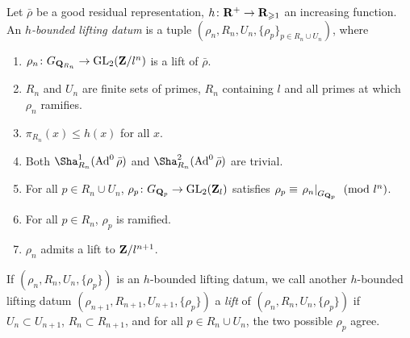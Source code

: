 \begin{definition}
Let $\bar\rho$ be a good residual representation, 
$h\colon \mathbf{R}^+ \to \mathbf{R}_{\geqslant 1}$ an 
increasing function. An \emph{$h$-bounded lifting datum} is a tuple 
$(\rho_n,R_n,U_n,\{\rho_p\}_{p\in R_n\cup U_n})$, where 
\begin{enumerate}
\item
$\rho_n\colon G_{\mathbf{Q}_{R_n}} \to \operatorname{GL}_2(\mathbf{Z}/l^n)$ is a lift of $\bar\rho$.

\item
$R_n$ and $U_n$ are finite sets of primes, $R_n$ containing $l$ and all primes at 
which $\rho_n$ ramifies. 

\item
$\pi_{R_n}(x)\leqslant h(x)$ for all $x$. 

\item
Both $\Sha_{R_n}^1(\Ad^0\bar\rho)$ and $\Sha_{R_n}^2(\Ad^0\bar\rho)$ are 
trivial. 

\item
For all $p\in R_n\cup U_n$, 
$\rho_p\colon G_{\mathbf{Q}_p} \to \operatorname{GL}_2(\mathbf{Z}_l)$ satisfies 
$\rho_p\equiv \left. \rho_n\right|_{G_{\mathbf{Q}_p}}\pmod{l^n}$. 

\item
For all $p\in R_n$, $\rho_p$ is ramified. 

\item
$\rho_n$ admits a lift to $\mathbf{Z}/l^{n+1}$. 
\end{enumerate}
\end{definition}

If $(\rho_n,R_n,U_n,\{\rho_p\})$ is an $h$-bounded lifting datum, we call 
another $h$-bounded lifting datum $(\rho_{n+1},R_{n+1},U_{n+1},\{\rho_p\})$ a 
\emph{lift} of $(\rho_n,R_n,U_n,\{\rho_p\})$ if $U_n\subset U_{n+1}$, 
$R_n\subset R_{n+1}$, and for all 
$p\in R_n\cup U_n$, the two possible $\rho_p$ agree. 

